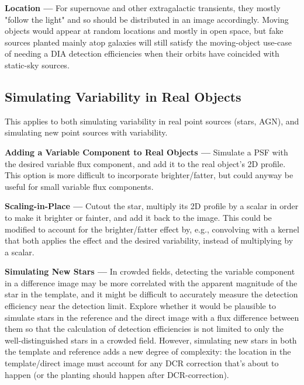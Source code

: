 \documentclass[DM,lsstdraft,toc]{lsstdoc}
\begin{document}
{\bf Location ---} For supernovae and other extragalactic transients, they mostly "follow the light" and so should be distributed in an image accordingly. Moving objects would appear at random locations and mostly in open space, but fake sources planted mainly atop galaxies will still satisfy the moving-object use-case of needing a DIA detection efficiencies when their orbits have coincided with static-sky sources.

\subsection{Simulating Variability in Real Objects}\label{ssec:opts_fakes_simvar}

This applies to both simulating variability in real point sources (stars, AGN), and simulating new point sources with variability.

{\bf Adding a Variable Component to Real Objects ---} Simulate a PSF with the desired variable flux component, and add it to the real object's 2D profile. This option is more difficult to incorporate brighter/fatter, but could anyway be useful for small variable flux components.

{\bf Scaling-in-Place ---} Cutout the star, multiply its 2D profile by a scalar in order to make it brighter or fainter, and add it back to the image. This could be modified to account for the brighter/fatter effect by, e.g., convolving with a kernel that both applies the effect and the desired variability, instead of multiplying by a scalar.

{\bf Simulating New Stars ---} In crowded fields, detecting the variable component in a difference image may be more correlated with the apparent magnitude of the star in the template, and it might be difficult to accurately measure the detection efficiency near the detection limit. Explore whether it would be plausible to simulate stars in the reference and the direct image with a flux difference between them so that the calculation of detection efficiencies is not limited to only the well-distinguished stars in a crowded field. However, simulating new stars in both the template and reference adds a new degree of complexity: the location in the template/direct image must account for any DCR correction that's about to happen (or the planting should happen after DCR-correction).


\end{document}
